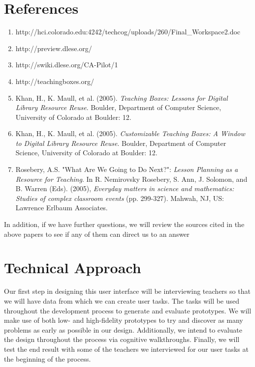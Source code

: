 \documentclass[12pt,titlepage]{article}
\begin{document}
\section{References}
\begin{enumerate}
	\item http://hci.colorado.edu:4242/techcog/uploads/260/Final\_Workspace2.doc

	\item http://preview.dlese.org/

	\item http://swiki.dlese.org/CA-Pilot/1

	\item http://teachingboxes.org/

	\item Khan, H., K. Maull, et al. (2005). \textit{Teaching Boxes: Lessons for
		Digital Library Resource Reuse}. Boulder, Department of Computer
		Science, University of Colorado at Boulder: 12.

	\item Khan, H., K. Maull, et al. (2005). \textit{Customizable Teaching
		Boxes: A Window to Digital Library Resource Reuse}. Boulder, Department
		of Computer Science, University of Colorado at Boulder: 12.

	\item Rosebery, A.S. "What Are We Going to Do Next?": \textit{Lesson
		Planning as a Resource for Teaching}.  In R. Nemirovsky Rosebery, S.
		Ann, J. Solomon, and B. Warren (Eds). (2005), \textit{Everyday matters
		in science and mathematics: Studies of complex classroom events} (pp.
		299-327). Mahwah, NJ, US: Lawrence Erlbaum Associates.

\end{enumerate}

In addition, if we have further questions, we will review the sources cited in
the above papers to see if any of them can direct us to an answer

\section{Technical Approach}

Our first step in designing this user interface will be interviewing teachers so
that we will have data from which we can create user tasks. The tasks will be
used throughout the development process to generate and evaluate prototypes. We
will make use of both low- and high-fidelity prototypes to try and discover as
many problems as early as possible in our design. Additionally, we intend to
evaluate the design throughout the process via cognitive walkthroughs. Finally,
we will test the end result with some of the teachers we interviewed for our
user tasks at the beginning of the process.
\end{document}

